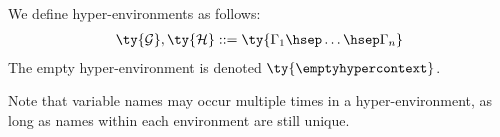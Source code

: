 \begin{definition}\label{def:hcp-hyperenvs}
  We define hyper-environments as follows:
  \begin{gather*}
    \ty{\mathcal{G}}, \ty{\mathcal{H}}
    ::= \ty{\Gamma_1 \hsep \dots \hsep \Gamma_n}
  \end{gather*}
  The empty hyper-environment is denoted $\ty{\emptyhypercontext}$.

  Note that variable names may occur multiple times in a hyper-environment, as
  long as names within each environment are still unique.
\end{definition}
